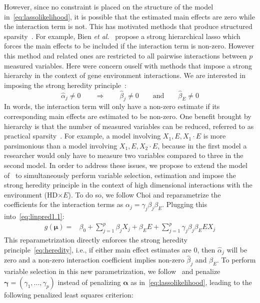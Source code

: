 \documentclass[12pt,letter]{article}\usepackage[]{graphicx}\usepackage[]{color}
\newcommand{\tm}[1]{\textrm{{#1}}}
\newcommand{\balpha}{\boldsymbol{\alpha}}
\newcommand {\bs}{\boldsymbol}
\newcommand{\bmu}{\boldsymbol{\mu}}
\begin{document}
However, since no constraint is placed on the structure of the model in~\ref{eq:lassolikelihood}, it is possible that the estimated main effects are zero while the interaction term is not. This has motivated methods that produce structured sparsity~\citep{bach2012structured}. For example, Bien \textit{et al.}~\citep{bien2013lasso} propose a strong hierarchical lasso which forces the main effects to be included if the interaction term is non-zero. However this method and related ones are restricted to all pairwise interactions between $p$ measured variables. Here were concern ouself with methods that impose a strong hierarchy in the context of gene environment interactions. We are interested in imposing the strong heredity principle~\citep{chipman1996bayesian}: 
\begin{equation}
\hat{\alpha}_{j} \neq 0 \qquad \Rightarrow \qquad \hat{\beta}_j \neq 0 \qquad \tm{and} \qquad \hat{\beta}_E \neq 0   \label{eq:heredity}
\end{equation}
In words, the interaction term will only have a non-zero estimate if its corresponding main effects are estimated to be non-zero. One benefit brought by hierarchy is that the number of measured variables can be reduced, referred to as practical sparsity~\citep{she2014group,bien2013lasso}. For example, a model involving $X_1, E, X_1 \cdot E$ is more parsimonious than a model involving $X_1, E, X_2 \cdot E$, because in the first model a researcher would only have to measure two variables compared to three in the second model. In order to address these issues, we propose to extend the model of~\citep{choi2010variable} to simultaneously perform variable selection, estimation and impose the strong heredity principle in the context of high dimensional interactions with the environment (HD$\times E$). To do so, we follow Choi and reparametrize the coefficients for the interaction terms as $\alpha_{j} = \gamma_{j} \beta_j \beta_E$. Plugging this into~\eqref{eq:linpred1.1}:
\begin{align}
g(\bmu)  = & \beta_0 + \sum_{j=1}^p \beta_j X_{j} + \beta_E E + \sum_{j=1}^p \gamma_{j} \beta_j \beta_E E X_j     \label{eq:linpred2}
\end{align}
This reparametrization directly enforces the strong heredity principle~\eqref{eq:heredity}, i.e., if either main effect estimates are 0, then $\hat{\alpha}_{j}$ will be zero and a non-zero interaction coefficient implies non-zero $\hat{\beta}_j$ and $\hat{\beta}_E$. To perform variable selection in this new parametrization, we follow~\cite{choi2010variable} and penalize $\bs{\gamma} = \left(\gamma_{1}, \ldots, \gamma_{p}\right)$ instead of penalizing $\balpha$ as in~\eqref{eq:lassolikelihood}, leading to the following penalized least squares criterion:
\end{document}
